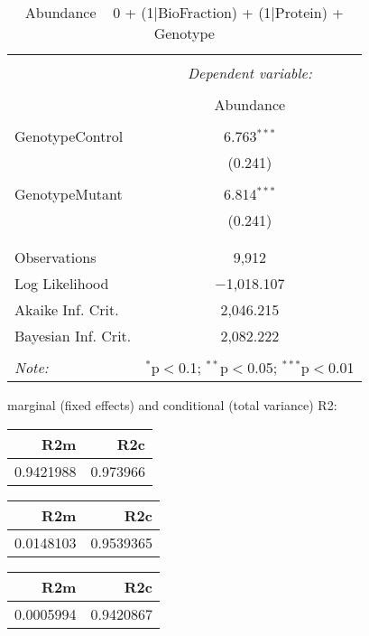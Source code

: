 \documentclass[11pt]{report}
\begin{document}
\begin{table}[!htbp] \centering 
  \caption{Abundance ~ 0 + (1|BioFraction) + (1|Protein) + Genotype} 
  \label{} 
\begin{tabular}{@{\extracolsep{5pt}}lc} 
\\[-1.8ex]\hline 
\hline \\[-1.8ex] 
 & \multicolumn{1}{c}{\textit{Dependent variable:}} \\ 
\cline{2-2} 
\\[-1.8ex] & Abundance \\ 
\hline \\[-1.8ex] 
 GenotypeControl & 6.763$^{***}$ \\ 
  & (0.241) \\ 
  & \\ 
 GenotypeMutant & 6.814$^{***}$ \\ 
  & (0.241) \\ 
  & \\ 
\hline \\[-1.8ex] 
Observations & 9,912 \\ 
Log Likelihood & $-$1,018.107 \\ 
Akaike Inf. Crit. & 2,046.215 \\ 
Bayesian Inf. Crit. & 2,082.222 \\ 
\hline 
\hline \\[-1.8ex] 
\textit{Note:}  & \multicolumn{1}{r}{$^{*}$p$<$0.1; $^{**}$p$<$0.05; $^{***}$p$<$0.01} \\ 
\end{tabular} 
\end{table} 
marginal (fixed effects) and conditional (total variance) R2:

\begin{tabular}{r|r}
\hline
R2m & R2c\\
\hline
0.9421988 & 0.973966\\
\hline
\end{tabular}

\begin{tabular}{r|r}
\hline
R2m & R2c\\
\hline
0.0148103 & 0.9539365\\
\hline
\end{tabular}

\begin{tabular}{r|r}
\hline
R2m & R2c\\
\hline
0.0005994 & 0.9420867\\
\hline
\end{tabular}
\end{document}
